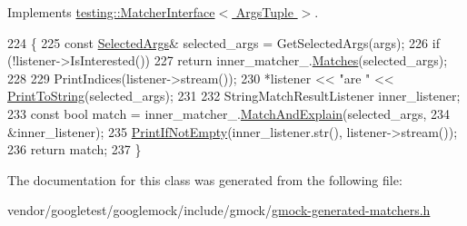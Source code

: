 Implements \hyperlink{classtesting_1_1MatcherInterface_a296b43607cd99d60365f0e6a762777cf}{testing\+::\+Matcher\+Interface$<$ Args\+Tuple $>$}.


\begin{DoxyCode}
224                                                                     \{
225     \textcolor{keyword}{const} \hyperlink{classtesting_1_1internal_1_1ArgsMatcherImpl_ab061679f6251e56ccbedaf0c316d00ff}{SelectedArgs}& selected\_args = GetSelectedArgs(args);
226     \textcolor{keywordflow}{if} (!listener->IsInterested())
227       \textcolor{keywordflow}{return} inner\_matcher\_.\hyperlink{classtesting_1_1internal_1_1MatcherBase_a105a9dae7afecee8898db8ad1887b0db}{Matches}(selected\_args);
228 
229     PrintIndices(listener->stream());
230     *listener << \textcolor{stringliteral}{"are "} << \hyperlink{namespacetesting_aa5717bb1144edd1d262d310ba70c82ed}{PrintToString}(selected\_args);
231 
232     StringMatchResultListener inner\_listener;
233     \textcolor{keyword}{const} \textcolor{keywordtype}{bool} match = inner\_matcher\_.\hyperlink{classtesting_1_1internal_1_1MatcherBase_ae3f5f3150a95cafb1c2ab7c864a42e65}{MatchAndExplain}(selected\_args,
234                                                       &inner\_listener);
235     \hyperlink{namespacetesting_1_1internal_a77c9e2b66d2b2414db4763971180d53c}{PrintIfNotEmpty}(inner\_listener.str(), listener->stream());
236     \textcolor{keywordflow}{return} match;
237   \}
\end{DoxyCode}


The documentation for this class was generated from the following file\+:\begin{DoxyCompactItemize}
\item 
vendor/googletest/googlemock/include/gmock/\hyperlink{gmock-generated-matchers_8h}{gmock-\/generated-\/matchers.\+h}\end{DoxyCompactItemize}
